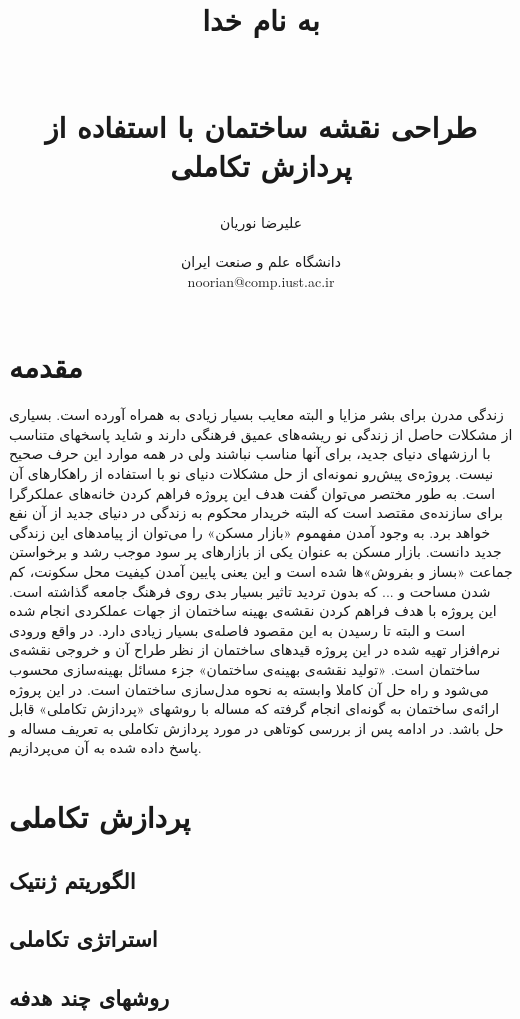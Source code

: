 \documentclass{report}
\title{
\begin{normalsize}
به نام خدا
\end{normalsize}
\\[4cm]
طراحی نقشه ساختمان با استفاده از پردازش تکاملی
}
\author{علیرضا نوریان
\\
\\ \small دانشگاه علم و صنعت ایران
\\ \small noorian@comp.iust.ac.ir
}
\begin{document}
\maketitle

\tableofcontents

\begin{abstract}

\end{abstract}

\section{مقدمه}
زندگی مدرن برای بشر مزایا و البته معایب بسیار زیادی به همراه آورده است. بسیاری از مشکلات حاصل از زندگی نو ریشه‌های عمیق فرهنگی دارند و شاید پاسخهای متناسب با ارزشهای دنیای جدید، برای آنها مناسب نباشند ولی در همه موارد این حرف صحیح نیست. پروژه‌ی پیش‌رو نمونه‌ای از حل مشکلات دنیای نو با استفاده از راهکارهای آن است. به طور مختصر می‌توان گفت هدف این پروژه فراهم کردن خانه‌های عملکرگرا برای سازنده‌ی مقتصد است که البته خریدار محکوم به زندگی در دنیای جدید از آن نفع خواهد برد.
به وجود آمدن مفهموم «بازار مسکن» را می‌توان از پیامدهای این زندگی جدید دانست. بازار مسکن به عنوان یکی از بازارهای پر سود موجب رشد و برخواستن جماعت «بساز و بفروش»ها شده است و این یعنی پایین آمدن کیفیت محل سکونت، کم شدن مساحت و ... که بدون تردید تاثیر بسیار بدی روی فرهنگ جامعه گذاشته است. این پروژه با هدف فراهم کردن نقشه‌ی بهینه ساختمان از جهات عملکردی انجام شده است و البته تا رسیدن به این مقصود فاصله‌ی بسیار زیادی دارد. در واقع ورودی نرم‌افزار تهیه شده در این پروژه قیدهای ساختمان از نظر طراح آن و خروجی نقشه‌ی ساختمان است.
«تولید نقشه‌ی بهینه‌ی ساختمان» جزء مسائل بهینه‌سازی محسوب می‌شود و راه حل آن کاملا وابسته به نحوه مدل‌سازی ساختمان است. در این پروژه ارائه‌ی ساختمان به گونه‌ای انجام گرفته که مساله با روشهای «پردازش تکاملی» قابل حل باشد. در ادامه پس از بررسی کوتاهی در مورد پردازش تکاملی به تعریف مساله و پاسخ داده شده به آن می‌پردازیم.

\section{پردازش تکاملی}
\subsection{الگوریتم ژنتیک}
\subsection{استراتژی تکاملی}
\subsection{روشهای چند هدفه}
\end{document}
